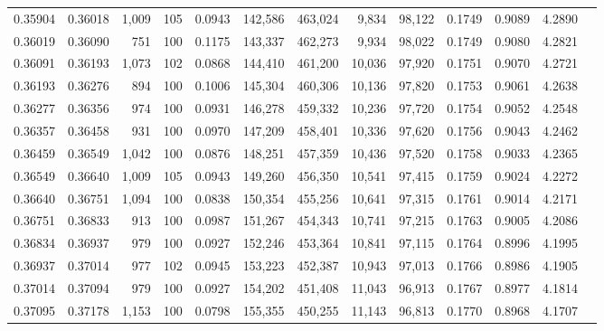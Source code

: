 \begin{tabular}{rrrrrrrrrrrrr}
0.35904 & 0.36018 & 1,009 & 105 &                                     0.0943 & 142,586 & 463,024 &   9,834 &  98,122 & 0.1749 & 0.9089 & 4.2890 \\
0.36019 & 0.36090 &   751 & 100 &                                     0.1175 & 143,337 & 462,273 &   9,934 &  98,022 & 0.1749 & 0.9080 & 4.2821 \\
0.36091 & 0.36193 & 1,073 & 102 &                                     0.0868 & 144,410 & 461,200 &  10,036 &  97,920 & 0.1751 & 0.9070 & 4.2721 \\
0.36193 & 0.36276 &   894 & 100 &                                     0.1006 & 145,304 & 460,306 &  10,136 &  97,820 & 0.1753 & 0.9061 & 4.2638 \\
0.36277 & 0.36356 &   974 & 100 &                                     0.0931 & 146,278 & 459,332 &  10,236 &  97,720 & 0.1754 & 0.9052 & 4.2548 \\
0.36357 & 0.36458 &   931 & 100 &                                     0.0970 & 147,209 & 458,401 &  10,336 &  97,620 & 0.1756 & 0.9043 & 4.2462 \\
0.36459 & 0.36549 & 1,042 & 100 &                                     0.0876 & 148,251 & 457,359 &  10,436 &  97,520 & 0.1758 & 0.9033 & 4.2365 \\
0.36549 & 0.36640 & 1,009 & 105 &                                     0.0943 & 149,260 & 456,350 &  10,541 &  97,415 & 0.1759 & 0.9024 & 4.2272 \\
0.36640 & 0.36751 & 1,094 & 100 &                                     0.0838 & 150,354 & 455,256 &  10,641 &  97,315 & 0.1761 & 0.9014 & 4.2171 \\
0.36751 & 0.36833 &   913 & 100 &                                     0.0987 & 151,267 & 454,343 &  10,741 &  97,215 & 0.1763 & 0.9005 & 4.2086 \\
0.36834 & 0.36937 &   979 & 100 &                                     0.0927 & 152,246 & 453,364 &  10,841 &  97,115 & 0.1764 & 0.8996 & 4.1995 \\
0.36937 & 0.37014 &   977 & 102 &                                     0.0945 & 153,223 & 452,387 &  10,943 &  97,013 & 0.1766 & 0.8986 & 4.1905 \\
0.37014 & 0.37094 &   979 & 100 &                                     0.0927 & 154,202 & 451,408 &  11,043 &  96,913 & 0.1767 & 0.8977 & 4.1814 \\
0.37095 & 0.37178 & 1,153 & 100 &                                     0.0798 & 155,355 & 450,255 &  11,143 &  96,813 & 0.1770 & 0.8968 & 4.1707 \\

\end{tabular}
